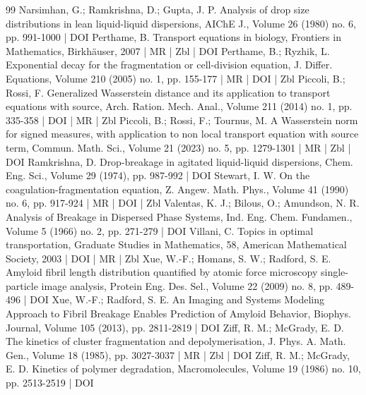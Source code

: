 \documentclass[10pt]{amsart}
\theoremstyle{definition}\newtheorem{defi}[theo]{Definition}\newtheorem{rema}[theo]{Remark}\newtheorem{exam}[theo]{Example}\newtheorem{exem}[theo]{Example}\newtheorem{nota}[theo]{Notation}
\begin{document}
\begin{thebibliography}{99}
Narsimhan, G.; Ramkrishna, D.; Gupta, J. P. Analysis of drop size distributions in lean liquid-liquid dispersions, AIChE J., Volume 26 (1980) no. 6, pp. 991-1000 | DOI
Perthame, B. Transport equations in biology, Frontiers in Mathematics, Birkhäuser, 2007 | MR | Zbl | DOI
Perthame, B.; Ryzhik, L. Exponential decay for the fragmentation or cell-division equation, J. Differ. Equations, Volume 210 (2005) no. 1, pp. 155-177 | MR | DOI | Zbl
Piccoli, B.; Rossi, F. Generalized Wasserstein distance and its application to transport equations with source, Arch. Ration. Mech. Anal., Volume 211 (2014) no. 1, pp. 335-358 | DOI | MR | Zbl
Piccoli, B.; Rossi, F.; Tournus, M. A Wasserstein norm for signed measures, with application to non local transport equation with source term, Commun. Math. Sci., Volume 21 (2023) no. 5, pp. 1279-1301 | MR | Zbl | DOI
Ramkrishna, D. Drop-breakage in agitated liquid-liquid dispersions, Chem. Eng. Sci., Volume 29 (1974), pp. 987-992 | DOI
Stewart, I. W. On the coagulation-fragmentation equation, Z. Angew. Math. Phys., Volume 41 (1990) no. 6, pp. 917-924 | MR | DOI | Zbl
Valentas, K. J.; Bilous, O.; Amundson, N. R. Analysis of Breakage in Dispersed Phase Systems, Ind. Eng. Chem. Fundamen., Volume 5 (1966) no. 2, pp. 271-279 | DOI
Villani, C. Topics in optimal transportation, Graduate Studies in Mathematics, 58, American Mathematical Society, 2003 | DOI | MR | Zbl
Xue, W.-F.; Homans, S. W.; Radford, S. E. Amyloid fibril length distribution quantified by atomic force microscopy single-particle image analysis, Protein Eng. Des. Sel., Volume 22 (2009) no. 8, pp. 489-496 | DOI
Xue, W.-F.; Radford, S. E. An Imaging and Systems Modeling Approach to Fibril Breakage Enables Prediction of Amyloid Behavior, Biophys. Journal, Volume 105 (2013), pp. 2811-2819 | DOI
Ziff, R. M.; McGrady, E. D. The kinetics of cluster fragmentation and depolymerisation, J. Phys. A. Math. Gen., Volume 18 (1985), pp. 3027-3037 | MR | Zbl | DOI
Ziff, R. M.; McGrady, E. D. Kinetics of polymer degradation, Macromolecules, Volume 19 (1986) no. 10, pp. 2513-2519 | DOI
\end{thebibliography}
\end{document}
